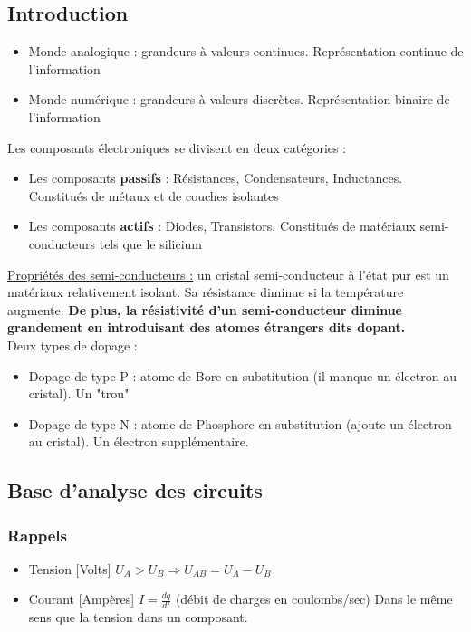 \documentclass[../main.tex]{subfiles}
\begin{document}
\localtableofcontents
\subsection{Introduction}
\begin{itemize}
    \item Monde analogique : grandeurs à valeurs continues. Représentation continue de l'information\\
    \item Monde numérique : grandeurs à valeurs discrètes. Représentation binaire de l'information\\
\end{itemize}

Les composants électroniques se divisent en deux catégories : \\
\begin{itemize}
    \item Les composants \textbf{passifs} : Résistances, Condensateurs, Inductances. Constitués de métaux et de couches isolantes\\
    \item Les composants \textbf{actifs} : Diodes, Transistors. Constitués de matériaux semi-conducteurs tels que le silicium\\
\end{itemize}

\underline{Propriétés des semi-conducteurs :} un cristal semi-conducteur à l'état pur est un matériaux relativement isolant. Sa résistance diminue si la température augmente. \textbf{De plus, la résistivité d'un semi-conducteur diminue grandement en introduisant des atomes étrangers dits dopant.}\\

Deux types de dopage :\\
\begin{itemize}
    \item Dopage de type P : atome de Bore en substitution (il manque un électron au cristal). Un "trou"\\
    \item Dopage de type N : atome de Phosphore en substitution (ajoute un électron au cristal). Un électron supplémentaire.\\
\end{itemize}

\subsection{Base d'analyse des circuits}
\subsubsection{Rappels}
\begin{itemize}
    \item Tension [Volts] $U_A> U_B \Rightarrow U_{AB} = U_A-U_B$\\
    \item Courant [Ampères] $I = \frac{dq}{dt}$ (débit de charges en coulombs/sec) \warning Dans le même sens que la tension dans un composant.\\
\end{itemize}
\end{document}
